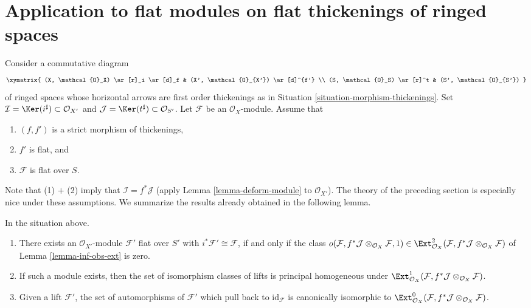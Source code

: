 \section{Application to flat modules on flat thickenings of ringed spaces}
\label{section-flat}

\noindent
Consider a commutative diagram
$$
\xymatrix{
(X, \mathcal{O}_X) \ar[r]_i \ar[d]_f & (X', \mathcal{O}_{X'}) \ar[d]^{f'} \\
(S, \mathcal{O}_S) \ar[r]^t & (S', \mathcal{O}_{S'})
}
$$
of ringed spaces whose horizontal arrows are first order thickenings as in
Situation \ref{situation-morphism-thickenings}. Set
$\mathcal{I} = \Ker(i^\sharp) \subset \mathcal{O}_{X'}$ and
$\mathcal{J} = \Ker(t^\sharp) \subset \mathcal{O}_{S'}$.
Let $\mathcal{F}$ be an $\mathcal{O}_X$-module. Assume that
\begin{enumerate}
\item $(f, f')$ is a strict morphism of thickenings,
\item $f'$ is flat, and
\item $\mathcal{F}$ is flat over $S$.
\end{enumerate}
Note that (1) $+$ (2) imply that $\mathcal{I} = f^*\mathcal{J}$
(apply Lemma \ref{lemma-deform-module} to $\mathcal{O}_{X'}$).
The theory of the preceding section is especially nice
under these assumptions. We summarize the results already obtained
in the following lemma.

\begin{lemma}
\label{lemma-flat}
In the situation above.
\begin{enumerate}
\item There exists an $\mathcal{O}_{X'}$-module $\mathcal{F}'$ flat over
$S'$ with $i^*\mathcal{F}' \cong \mathcal{F}$, if and only if
the class
$o(\mathcal{F}, f^*\mathcal{J} \otimes_{\mathcal{O}_X} \mathcal{F}, 1)
\in \Ext^2_{\mathcal{O}_X}(
\mathcal{F}, f^*\mathcal{J} \otimes_{\mathcal{O}_X} \mathcal{F})$
of Lemma \ref{lemma-inf-obs-ext} is zero.
\item If such a module exists, then the set of isomorphism classes
of lifts is principal homogeneous under
$\Ext^1_{\mathcal{O}_X}(
\mathcal{F}, f^*\mathcal{J} \otimes_{\mathcal{O}_X} \mathcal{F})$.
\item Given a lift $\mathcal{F}'$, the set of automorphisms of
$\mathcal{F}'$ which pull back to $\text{id}_\mathcal{F}$ is canonically
isomorphic to $\Ext^0_{\mathcal{O}_X}(
\mathcal{F}, f^*\mathcal{J} \otimes_{\mathcal{O}_X} \mathcal{F})$.
\end{enumerate}
\end{lemma}

